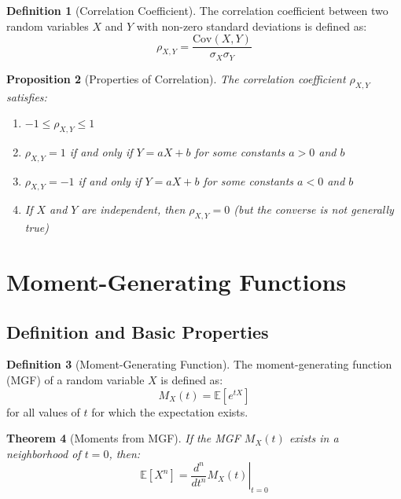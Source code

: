 \documentclass[12pt,a4paper]{article}
\theoremstyle{plain}
\newtheorem{theorem}{Theorem}[section]
\newtheorem{proposition}[theorem]{Proposition}
\theoremstyle{definition}
\newtheorem{definition}[theorem]{Definition}
\begin{document}
\begin{definition}[Correlation Coefficient]
The correlation coefficient between two random variables $X$ and $Y$ with non-zero standard deviations is defined as:
\begin{equation}
\rho_{X,Y} = \frac{\text{Cov}(X, Y)}{\sigma_X \sigma_Y}
\end{equation}
\end{definition}

\begin{proposition}[Properties of Correlation]
The correlation coefficient $\rho_{X,Y}$ satisfies:
\begin{enumerate}[label=(\roman*)]
\item $-1 \leq \rho_{X,Y} \leq 1$
\item $\rho_{X,Y} = 1$ if and only if $Y = aX + b$ for some constants $a > 0$ and $b$
\item $\rho_{X,Y} = -1$ if and only if $Y = aX + b$ for some constants $a < 0$ and $b$
\item If $X$ and $Y$ are independent, then $\rho_{X,Y} = 0$ (but the converse is not generally true)
\end{enumerate}
\end{proposition}

\section{Moment-Generating Functions}

\subsection{Definition and Basic Properties}

\begin{definition}[Moment-Generating Function]
The moment-generating function (MGF) of a random variable $X$ is defined as:
\begin{equation}
M_X(t) = \mathbb{E}[e^{tX}]
\end{equation}
for all values of $t$ for which the expectation exists.
\end{definition}

\begin{theorem}[Moments from MGF]
If the MGF $M_X(t)$ exists in a neighborhood of $t = 0$, then:
\begin{equation}
\mathbb{E}[X^n] = \left.\frac{d^n}{dt^n}M_X(t)\right|_{t=0}
\end{equation}
\end{theorem}
\end{document}
